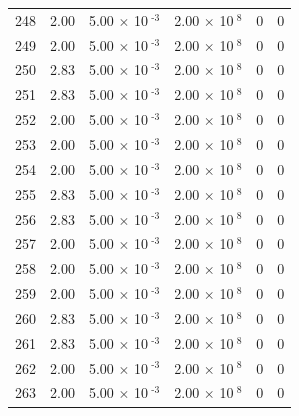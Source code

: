 \documentclass[a4paper,11pt]{article}
\begin{document}
\begin{center}
\begin{longtable}{|R{1.5cm}|R{2.4cm}|R{2.4cm}|R{2.4cm}|R{2.4cm}|R{2.4cm}|}
  248 &   2.00  &         5.00 $\times$ 10$^{\text{          -3}}$  &         2.00 $\times$ 10$^{\text{           8}}$  & 0  & 0 \\
  249 &   2.00  &         5.00 $\times$ 10$^{\text{          -3}}$  &         2.00 $\times$ 10$^{\text{           8}}$  & 0  & 0 \\
  250 &   2.83  &         5.00 $\times$ 10$^{\text{          -3}}$  &         2.00 $\times$ 10$^{\text{           8}}$  & 0  & 0 \\
  251 &   2.83  &         5.00 $\times$ 10$^{\text{          -3}}$  &         2.00 $\times$ 10$^{\text{           8}}$  & 0  & 0 \\
  252 &   2.00  &         5.00 $\times$ 10$^{\text{          -3}}$  &         2.00 $\times$ 10$^{\text{           8}}$  & 0  & 0 \\
  253 &   2.00  &         5.00 $\times$ 10$^{\text{          -3}}$  &         2.00 $\times$ 10$^{\text{           8}}$  & 0  & 0 \\
  254 &   2.00  &         5.00 $\times$ 10$^{\text{          -3}}$  &         2.00 $\times$ 10$^{\text{           8}}$  & 0  & 0 \\
  255 &   2.83  &         5.00 $\times$ 10$^{\text{          -3}}$  &         2.00 $\times$ 10$^{\text{           8}}$  & 0  & 0 \\
  256 &   2.83  &         5.00 $\times$ 10$^{\text{          -3}}$  &         2.00 $\times$ 10$^{\text{           8}}$  & 0  & 0 \\
  257 &   2.00  &         5.00 $\times$ 10$^{\text{          -3}}$  &         2.00 $\times$ 10$^{\text{           8}}$  & 0  & 0 \\
  258 &   2.00  &         5.00 $\times$ 10$^{\text{          -3}}$  &         2.00 $\times$ 10$^{\text{           8}}$  & 0  & 0 \\
  259 &   2.00  &         5.00 $\times$ 10$^{\text{          -3}}$  &         2.00 $\times$ 10$^{\text{           8}}$  & 0  & 0 \\
  260 &   2.83  &         5.00 $\times$ 10$^{\text{          -3}}$  &         2.00 $\times$ 10$^{\text{           8}}$  & 0  & 0 \\
  261 &   2.83  &         5.00 $\times$ 10$^{\text{          -3}}$  &         2.00 $\times$ 10$^{\text{           8}}$  & 0  & 0 \\
  262 &   2.00  &         5.00 $\times$ 10$^{\text{          -3}}$  &         2.00 $\times$ 10$^{\text{           8}}$  & 0  & 0 \\
  263 &   2.00  &         5.00 $\times$ 10$^{\text{          -3}}$  &         2.00 $\times$ 10$^{\text{           8}}$  & 0  & 0 \\

\end{longtable}
\end{center}
\end{document}
